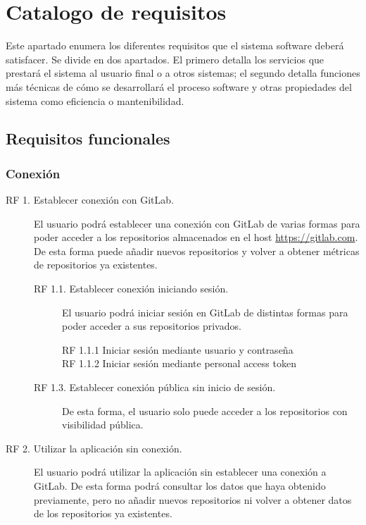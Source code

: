 \section{Catalogo de requisitos}
Este apartado enumera los diferentes requisitos que el sistema software deberá satisfacer. Se divide en dos apartados. El primero detalla los servicios que prestará el sistema al usuario final o a otros sistemas; el segundo detalla funciones más técnicas de cómo se desarrollará el proceso software y otras propiedades del sistema como eficiencia o mantenibilidad.

\subsection{Requisitos funcionales}
\subsubsection{Conexión}
\begin{description}
	\item[RF 1. Establecer conexión con GitLab.] El usuario podrá establecer una conexión con GitLab de varias formas para poder acceder a los repositorios almacenados en el host \url{https://gitlab.com}. De esta forma puede añadir nuevos repositorios y volver a obtener métricas de repositorios ya existentes.
	\begin{description}
		\item[RF 1.1. Establecer conexión iniciando sesión.] El usuario podrá iniciar sesión  en GitLab de distintas formas para poder acceder a sus repositorios privados.
		\begin{description}
			\item[RF 1.1.1 Iniciar sesión mediante usuario y contraseña]
			\item[RF 1.1.2 Iniciar sesión mediante personal access token]
		\end{description}

		\item[RF 1.3. Establecer conexión pública sin inicio de sesión.] De esta forma, el usuario solo puede acceder a los repositorios con visibilidad pública.
	\end{description}
	\item[RF 2. Utilizar la aplicación sin conexión.] El usuario podrá utilizar la aplicación sin establecer una conexión a GitLab. De esta forma podrá consultar los datos que haya obtenido previamente, pero no añadir nuevos repositorios ni volver a obtener datos de los repositorios ya existentes.
\end{description}
